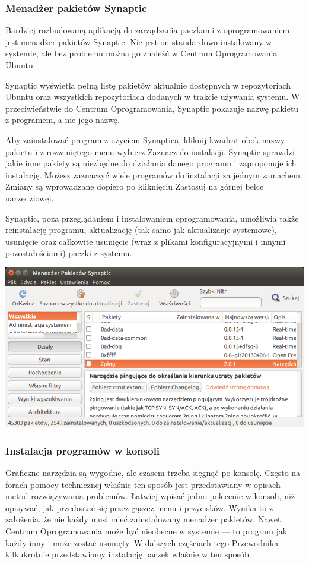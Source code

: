 \subsubsection{Menadżer pakietów Synaptic}
Bardziej rozbudowaną aplikacją do zarządzania paczkami z oprogramowaniem jest menadżer pakietów \textcolor{ubuntu_orange}{Synaptic}. Nie jest on standardowo instalowany w systemie, ale bez problemu można go znaleźć w Centrum Oprogramowania Ubuntu.

Synaptic wyświetla pełną listę pakietów aktualnie dostępnych w repozytoriach Ubuntu oraz wszystkich repozytoriach dodanych w trakcie używania systemu. W przeciwieństwie do Centrum Oprogramowania, Synaptic pokazuje nazwę pakietu z programem, a nie jego nazwę.

Aby zainstalować program z użyciem Synaptica, kliknij kwadrat obok nazwy pakietu i z rozwiniętego menu wybierz \textcolor{ubuntu_orange}{Zaznacz do instalacji}. Synaptic sprawdzi jakie inne pakiety są niezbędne do działania danego programu i zaproponuje ich instalację. Możesz zaznaczyć wiele programów do instalacji za jednym zamachem. Zmiany są wprowadzane dopiero po kliknięciu \textcolor{ubuntu_orange}{Zastosuj} na górnej belce narzędziowej.

Synaptic, poza przeglądaniem i instalowaniem oprogramowania, umożliwia także reinstalację programu, aktualizację (tak samo jak aktualizacje systemowe), usunięcie oraz całkowite usunięcie (wraz z plikami konfiguracyjnymi i innymi pozostałościami) paczki z systemu.

\begin{center}
	\includegraphics[width=\linewidth]{images/programy_synaptic.png}
\end{center}

\subsubsection{Instalacja programów w konsoli}
Graficzne narzędzia są wygodne, ale czasem trzeba sięgnąć po konsolę. Często na forach pomocy technicznej właśnie ten sposób jest przedstawiany w opisach metod rozwiązywania problemów. Łatwiej wpisać jedno polecenie w konsoli, niż opisywać, jak przedostać się przez gąszcz menu i przycisków. Wynika to z założenia, że nie każdy musi mieć zainstalowany menadżer pakietów. Nawet Centrum Oprogramowania może być nieobecne w systemie --- to program jak każdy inny i może zostać usunięty.
W dalszych częściach tego Przewodnika kilkukrotnie przedstawiamy instalację paczek właśnie w ten sposób.

